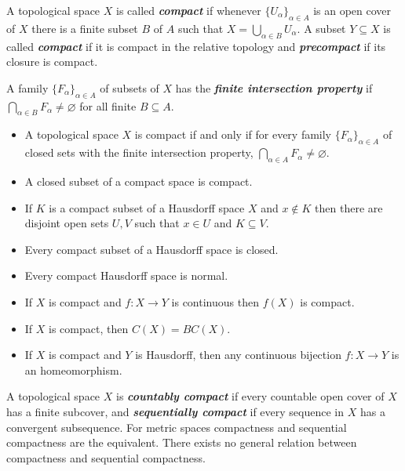 \documentclass{article}
\theoremstyle{definition}
\numberwithin{equation}{section}
\begin{document}
		A topological space $X$ is called \textbf{\textit{compact}} if whenever $\{U_\alpha\}_{\alpha\in A}$ is an open cover of $X$ there is a finite subset $B$ of $A$ such that $X=\bigcup_{\alpha\in B}U_\alpha$. A subset $Y\subseteq X$ is called \textbf{\textit{compact}} if it is compact in the relative topology and \textbf{\textit{precompact}} if its closure is compact.
		
		A family $\{F_\alpha\}_{\alpha\in A}$ of subsets of $X$ has the \textbf{\textit{finite intersection property}} if $\bigcap_{\alpha\in B}F_\alpha\neq\varnothing$ for all finite $B\subseteq A$.
		
		\begin{prop}\leavevmode
			\begin{itemize}
				\item A topological space $X$ is compact if and only if for every family $\{F_\alpha\}_{\alpha\in A}$ of closed sets with the finite intersection property, $\bigcap_{\alpha\in A}F_\alpha\neq\varnothing$.
				\item A closed subset of a compact space is compact.
				\item If $K$ is a compact subset of a Hausdorff space $X$ and $x\notin K$ then there are disjoint open sets $U,V$ such that $x\in U$ and $K\subseteq V$.
				\item Every compact subset of a Hausdorff space is closed.
				\item Every compact Hausdorff space is normal.
				\item If $X$ is compact and $f:X\to Y$ is continuous then $f(X)$ is compact.
				\item If $X$ is compact, then $C(X)=BC(X)$.
				\item If $X$ is compact and $Y$ is Hausdorff, then any continuous bijection $f:X\to Y$ is an homeomorphism.
			\end{itemize}
		\end{prop}
		A topological space $X$ is \textbf{\textit{countably compact}} if every countable open cover of $X$ has a finite subcover, and \textbf{\textit{sequentially compact}} if every sequence in $X$ has a convergent subsequence. For metric spaces compactness and sequential compactness are the equivalent. There exists no general relation between compactness and sequential compactness.
		
\end{document}

